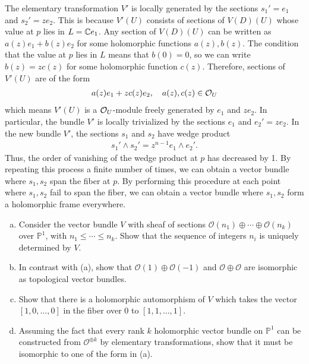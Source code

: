 \documentclass[12pt]{article}  %
\begin{document}
\begin{solution}
    The elementary transformation $V'$ is locally generated by the sections $s_1' = e_1$ and $s_2' = z e_2$. This is because $V'(U)$ consists of sections of $V(D)(U)$ whose value at $p$ lies in $L = \mathbb{C} e_1$. Any section of $V(D)(U)$ can be written as $a(z)e_1 + b(z)e_2$ for some holomorphic functions $a(z), b(z)$. The condition that the value at $p$ lies in $L$ means that $b(0) = 0$, so we can write $b(z) = z c(z)$ for some holomorphic function $c(z)$. Therefore, sections of $V'(U)$ are of the form \begin{align*}
        a(z)e_1 + z c(z)e_2, \quad a(z), c(z) \in {\mathcal{O}}_U
    \end{align*} which means $V'(U)$ is a ${\mathcal{O}}_U$-module freely generated by $e_1$ and $z e_2$. In particular, the bundle $V'$ is locally trivialized by the sections $e_1$ and $e_2' = z e_2$. In the new bundle $V'$, the sections $s_1$ and $s_2$ have wedge product \begin{align*}
        s_1' \wedge s_2' = z^{n-1} e_1 \wedge e_2'.
    \end{align*} Thus, the order of vanishing of the wedge product at $p$ has decreased by 1. By repeating this process a finite number of times, we can obtain a vector bundle where $s_1, s_2$ span the fiber at $p$. By performing this procedure at each point where $s_1, s_2$ fail to span the fiber, we can obtain a vector bundle where $s_1, s_2$ form a holomorphic frame everywhere.
\end{solution}

\begin{problem}[3]
    \leavevmode
    \begin{enumerate}[(a)]
        \item Consider the vector bundle $V$ with sheaf of sections $\mathcal{O}(n_1) \oplus \cdots \oplus \mathcal{O}(n_k)$ over $\mathbb{P}^1$, with $n_1 \le \cdots \le n_k$. Show that the sequence of integers $n_i$ is uniquely determined by $V$.
        \item In contrast with (a), show that $\mathcal{O}(1)\oplus\mathcal{O}(-1)$ and $\mathcal{O}\oplus\mathcal{O}$ are isomorphic as topological vector bundles.
        \item Show that there is a holomorphic automorphism of $V$ which takes the vector $[1,0,\dots,0]$ in the fiber over $0$ to $[1,1,\dots,1]$.
        \item Assuming the fact that every rank $k$ holomorphic vector bundle on $\mathbb{P}^1$ can be constructed from $\mathcal{O}^{\oplus k}$ by elementary transformations, show that it must be isomorphic to one of the form in (a).
    \end{enumerate}
\end{problem}
\end{document}
